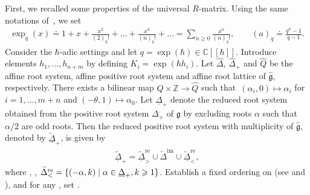 \documentclass[pdftex]{sigma}
\numberwithin{equation}{section}
\begin{document}
First, we recalled some properties of the universal $R$-matrix. Using the same notations of~\cite{SMVN2}, we set
\begin{gather*}
 \exp_q(x)\doteq1+x+\frac{x^2}{(2)_q!}+\dots+\frac{x^n}{(n)_q!}+\dots=\sum_{n\geq0}\frac{x^n}{(n)_q!},\qquad
 (a)_q\doteq\frac{q^a-1}{q-1}.
\end{gather*}
 Consider the $\hbar$-adic settings and let $q=\exp(\hbar)\in\mathbb{C}[[\hbar]]$.
Introduce elements $h_1,\dots,h_{n+m}$ by defining $K_i=\exp(\hbar h_i)$.
Let $\widehat{\Delta}$, $\widehat{\Delta}_+$ and $\widehat{Q}$ be the affine root system, affine positive root system and affine root lattice of $\mathfrak{\hat{g}}$, respectively.
There exists a bilinear map $Q\times \mathbb{Z}\rightarrow\widehat{Q}$ such that~${(\alpha_i,0)\mapsto \alpha_i}$ for $i=1,\ldots,m+n$ and $(-\theta,1)\mapsto \alpha_0$. Let $\underline{\Delta}_+$ denote the reduced root system obtained from the positive root system $\Delta_+$ of $\mathfrak{g}$ by excluding roots $\alpha$ such that $\alpha/2$ are odd roots.
Then the reduced positive root system with multiplicity of $\mathfrak{\hat{g}}$, denoted by $\widetilde{\underline{\Delta}}_+$, is given by
\begin{gather*}
\widetilde{\underline{\Delta}}_+=\widetilde{\underline{\Delta}}^{\text{re}}_{>}\cup \widetilde{\Delta}^{\text{im}}\cup \widetilde{\underline{\Delta}}^{\text{re}}_{<},
\end{gather*}
where , , $\smash{\widetilde{\Delta}^{\text{re}}_{<}=\{ (-\alpha,k)} \mid \alpha\in \underline{\Delta}_+, \allowbreak {k\geqslant 1} \}$.
Establish a fixed ordering on \smash{$\widetilde{\underline{\Delta}}_+$} (see \cite[Section 3]{SMVN} and
\cite {XWLHZ}), and for any \smash{$\alpha\in\widetilde{\underline{\Delta}}_+$}, set .
\end{document}
